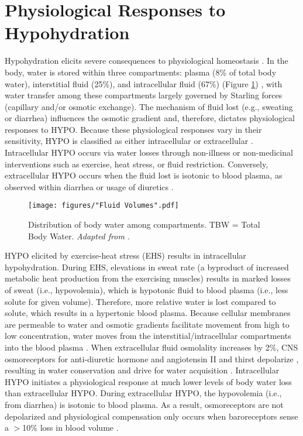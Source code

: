 \section{Physiological Responses to Hypohydration}
Hypohydration elicits severe consequences to physiological homeostasis \cite{iom_dietary_2004}. In the body, water is stored within three compartments: plasma (8\% of total body water), interstitial fluid (25\%), and intracellular fluid (67\%) (Figure \ref{fig:fluidVolumes}) \cite{sawka_thermoregulatory_1985}, with water transfer among these compartments largely governed by Starling forces (capillary and/or osmotic exchange). The mechanism of fluid lost (e.g., sweating or diarrhea) influences the osmotic gradient and, therefore, dictates physiological responses to HYPO. Because these physiological responses vary in their sensitivity, HYPO is classified as either intracellular or extracellular \cite{cheuvront_dehydration:_2014}. Intracellular HYPO occurs via water losses through non-illness or non-medicinal interventions such as exercise, heat stress, or fluid restriction. Conversely, extracellular HYPO occurs when the fluid lost is isotonic to blood plasma, as observed within diarrhea or usage of diuretics \cite{cheuvront_dehydration:_2014,cheuvront_mechanisms_2010}. 

\begin{figure}
	\centering
	\texttt{[image: figures/"Fluid Volumes".pdf]}
	\caption{Distribution of body water among compartments. TBW = Total Body Water. \textit{Adapted from \cite{sawka_thermoregulatory_1985}}.}
	\label{fig:fluidVolumes}
\end{figure}

HYPO elicited by exercise-heat stress (EHS) results in intracellular hypohydration. During EHS, elevations in sweat rate (a byproduct of increased metabolic heat production from the exercising muscles) \cite{sawka_integrated_2011} results in marked losses of sweat (i.e., hypovolemia), which is hypotonic fluid to blood plasma (i.e., less solute for given volume). Therefore, more relative water is lost compared to solute, which results in a hypertonic blood plasma. Because cellular membranes are permeable to water and osmotic gradients facilitate movement from high to low concentration, water moves from the interstitial/intracellular compartments into the blood plasma \cite{cheuvront_dehydration:_2014,costill_muscle_1976,darrow_changes_1935}. When extracellular fluid osmolality increases by 2\%, CNS osmoreceptors for anti-diuretic hormone and angiotensin II and thirst depolarize \cite{bourque_central_2008}, resulting in water conservation and drive for water acquisition \cite{andreoli_endocrine_2010}. Intracellular HYPO initiates a physiological response at much lower levels of body water loss than extracellular HYPO. During extracellular HYPO, the hypovolemia (i.e., from diarrhea) is isotonic to blood plasma. As a result, osmoreceptors are not depolarized and physiological compensation only occurs when baroreceptors sense a $>$10\% loss in blood volume \cite{cheuvront_dehydration:_2014}.

